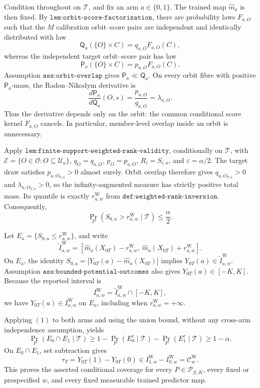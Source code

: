 Condition throughout on \(\mathcal T\), and fix an arm \(a\in\{0,1\}\). The trained map \(\widehat m_a\) is then fixed. By \(\texttt{lem:orbit-score-factorization}\), there are probability laws \(F_{a,O}\) such that the \(M\) calibration orbit--score pairs are independent and identically distributed with law
\[
\mathsf Q_a(\{O\}\times C)=q_{a,O}F_{a,O}(C),
\]
whereas the independent target orbit--score pair has law
\[
\mathsf P_a(\{O\}\times C)=p_{a,O}F_{a,O}(C).
\]
Assumption \(\texttt{ass:orbit-overlap}\) gives \(\mathsf P_a\ll\mathsf Q_a\). On every orbit fibre with positive \(\mathsf P_a\)-mass, the Radon--Nikodym derivative is
\[
\frac{d\mathsf P_a}{d\mathsf Q_a}(O,s)=\frac{p_{a,O}}{q_{a,O}}=\lambda_{a,O}.
\]
Thus the derivative depends only on the orbit: the common conditional score kernel \(F_{a,O}\) cancels. In particular, member-level overlap inside an orbit is unnecessary.

Apply \(\texttt{lem:finite-support-weighted-rank-validity}\), conditionally on \(\mathcal T\), with \(\mathscr E=\{O\in\mathcal O:O\subseteq\mathcal U_a\}\), \(q_O=q_{a,O}\), \(p_O=p_{a,O}\), \(R_i=S_{i,a}\), and \(\varepsilon=\alpha/2\). The target draw satisfies \(p_{a,O_{T,a}}>0\) almost surely. Orbit overlap therefore gives \(q_{a,O_{T,a}}>0\) and \(\lambda_{a,O_{T,a}}>0\), so the infinity-augmented measure has strictly positive total mass. Its quantile is exactly \(r^{\mathrm W}_{a,w}\) from \(\texttt{def:weighted-rank-inversion}\). Consequently,
\[
\Pr_P\!\left(S_{0,a}>r^{\mathrm W}_{a,w}\mid\mathcal T\right)\le\frac{\alpha}{2}.\tag{1}
\]

Let \(E_a=\{S_{0,a}\le r^{\mathrm W}_{a,w}\}\), and write
\[
\widetilde I^{\mathrm W}_{a,w}=\left[\widehat m_a(X_{0T})-r^{\mathrm W}_{a,w},\,\widehat m_a(X_{0T})+r^{\mathrm W}_{a,w}\right].
\]
On \(E_a\), the identity \(S_{0,a}=|Y_{0T}(a)-\widehat m_a(X_{0T})|\) implies \(Y_{0T}(a)\in\widetilde I^{\mathrm W}_{a,w}\). Assumption \(\texttt{ass:bounded-potential-outcomes}\) also gives \(Y_{0T}(a)\in[-K,K]\). Because the reported interval is
\[
I^{\mathrm W}_{a,w}=\widetilde I^{\mathrm W}_{a,w}\cap[-K,K],
\]
we have \(Y_{0T}(a)\in I^{\mathrm W}_{a,w}\) on \(E_a\), including when \(r^{\mathrm W}_{a,w}=+\infty\).

Applying \((1)\) to both arms and using the union bound, without any cross-arm independence assumption, yields
\[
\Pr_P(E_0\cap E_1\mid\mathcal T)\ge 1-\Pr_P(E_0^c\mid\mathcal T)-\Pr_P(E_1^c\mid\mathcal T)\ge1-\alpha.
\]
On \(E_0\cap E_1\), set subtraction gives
\[
\tau_T=Y_{0T}(1)-Y_{0T}(0)\in I^{\mathrm W}_{1,w}-I^{\mathrm W}_{0,w}=\mathcal C^{\mathrm W}_w.
\]
This proves the asserted conditional coverage for every \(P\in\mathcal P_{\mathcal G,K}\), every fixed or prespecified \(w\), and every fixed measurable trained predictor map.

